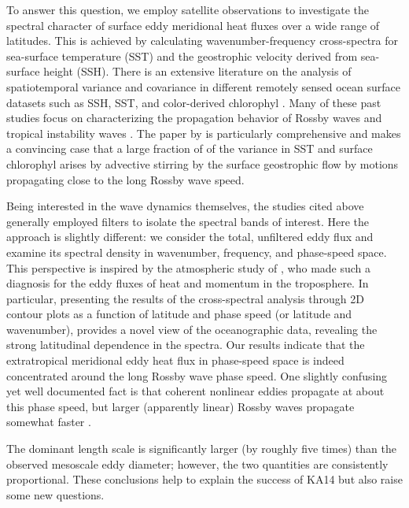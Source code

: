\documentclass[10pt]{article}
\begin{document}
To answer this question, we employ satellite observations to investigate the spectral character of surface eddy meridional heat fluxes over a wide range of latitudes. This is achieved by calculating wavenumber-frequency cross-spectra for sea-surface temperature (SST) and the geostrophic velocity derived from sea-surface height (SSH). There is an extensive literature on the analysis of spatiotemporal variance and covariance in different remotely sensed ocean surface datasets such as SSH, SST, and color-derived chlorophyl \citep[see review by][]{OBrienEtAl2013}. Many of these past studies focus on characterizing the propagation behavior of Rossby waves \citep{CheltonSchalx1996,PolitoCornillon1997,CipolliniEtAl1997,HillEtAl2000,CipolliniEtAl2001,PolitoLiu2003,KillworthEtAl2004} and tropical instability waves \citep{PolitoEtAl2001,Contreras2002,CheltonEtAl2000,LeeEtAl2012}. The paper by \citet{KillworthEtAl2004} is particularly comprehensive and makes a convincing case that a large fraction of of the variance in SST and surface chlorophyl arises by advective stirring by the surface geostrophic flow by motions propagating close to the long Rossby wave speed.

Being interested in the wave dynamics themselves, the studies cited above generally employed filters to isolate the spectral bands of interest. Here the approach is slightly different: we consider the total, unfiltered eddy flux and examine its spectral density in wavenumber, frequency, and phase-speed space. This perspective is inspired by the atmospheric study of \citet[][henceforth RH91]{RandelHeld1991}, who made such a diagnosis for the eddy fluxes of heat and momentum in the troposphere. In particular, presenting the results of the cross-spectral analysis through 2D contour plots as a function of latitude and phase speed (or latitude and wavenumber), provides a novel view of the oceanographic data, revealing the strong latitudinal dependence in the spectra. Our results indicate that the extratropical meridional eddy heat flux in phase-speed space is indeed concentrated around the long Rossby wave phase speed. One slightly confusing yet well documented fact is  that coherent nonlinear eddies propagate at about this phase speed, but larger (apparently linear) Rossby waves propagate somewhat faster \citet{CheltonEtAl2007,CheltonEtAl2011}.

The dominant length scale is significantly larger (by roughly five times) than the observed mesoscale eddy diameter; however, the two quantities are consistently proportional. These conclusions help to explain the success of KA14 but also raise some new questions.
\end{document}
